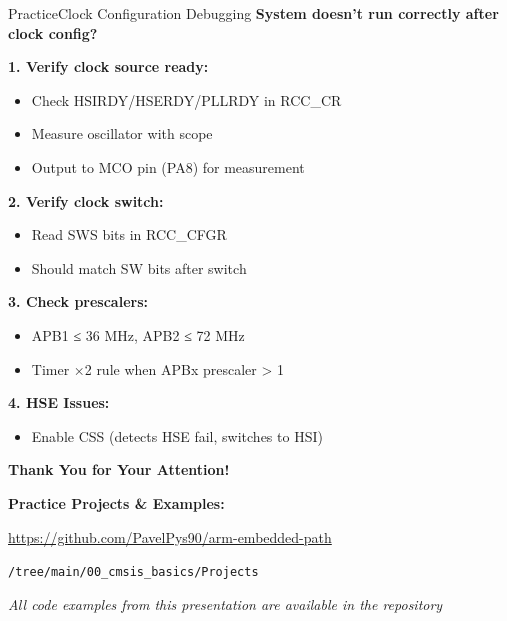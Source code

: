 \documentclass{beamer}
\begin{document}
\begin{frame}{Practice}{Clock Configuration Debugging}
	\textbf{System doesn't run correctly after clock config?}
	
	\medskip
	\textbf{1. Verify clock source ready:}
	\begin{itemize}
		\item Check HSIRDY/HSERDY/PLLRDY in RCC\_CR
		\item Measure oscillator with scope
		\item Output to MCO pin (PA8) for measurement
	\end{itemize}
	
	\textbf{2. Verify clock switch:}
	\begin{itemize}
		\item Read SWS bits in RCC\_CFGR
		\item Should match SW bits after switch
	\end{itemize}
	
	\textbf{3. Check prescalers:}
	\begin{itemize}
		\item APB1 ≤ 36 MHz, APB2 ≤ 72 MHz
		\item Timer ×2 rule when APBx prescaler > 1
	\end{itemize}
	
	\textbf{4. HSE Issues:}
	\begin{itemize}
		\item Enable CSS (detects HSE fail, switches to HSI)
	\end{itemize}
\end{frame}
\begin{frame}{}
	\begin{center}
		\Large
		\textbf{Thank You for Your Attention!}
		
		\vspace{1cm}
		
		\normalsize
		\textbf{Practice Projects \& Examples:}
		
		\vspace{0.5cm}
		
		\url{https://github.com/PavelPys90/arm-embedded-path}
		
		\texttt{/tree/main/00\_cmsis\_basics/Projects}
		
		\vspace{1cm}
		
		\textit{All code examples from this presentation are available in the repository}
	\end{center}
\end{frame}
\end{document}
